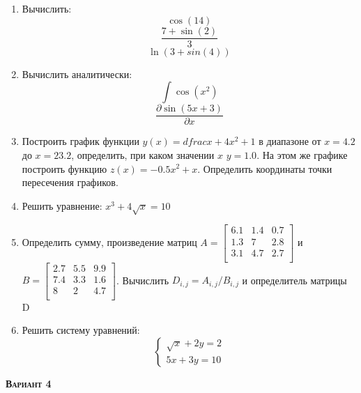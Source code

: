 \begin{enumerate}
\item Вычислить: 
\begin{equation*}\cos(14)                          \end{equation*}
\begin{equation*}\dfrac{7+\sin(2)}{3}              \end{equation*}
\begin{equation*}\ln(3+sin(4))                     \end{equation*}

\item Вычислить аналитически: 
 \begin{equation*} \int \cos(x^2)          \end{equation*}\begin{equation*} {\dfrac{\partial \sin(5 x +3)}{\partial x}} \end{equation*}
\item Построить график функции $y(x)=dfrac{x+4}{x^2+1}$ в диапазоне от $x=4.2$ до $x=23.2$, определить, при каком значении $x$ $y=1.0$. На этом же графике построить функцию $z(x)=-0.5 x^2 + x              $. Определить координаты точки пересечения графиков. \item Решить уравнение: $x^3+4 \sqrt{x}=10    $

\item Определить сумму, произведение матриц $A=\begin{bmatrix}
6.1 &1.4 &0.7 \\
1.3 &7 &2.8 \\
3.1 &4.7 &2.7 \\
\end{bmatrix}
$ и $B=\begin{bmatrix}
2.7 &5.5 &9.9 \\
7.4 &3.3 &1.6 \\
8 &2 &4.7 \\
\end{bmatrix}
$. Вычислить $D_{i,j}=A_{i,j}  /  B_{i,j}$ и определитель матрицы D

\item Решить систему уравнений: \begin{equation*} \begin{cases} \sqrt{x}+2y=2        \\ 5x +3y=10             \end{cases} \end{equation*} 

\end{enumerate}
\textsc{\textbf{Вариант 4}}

